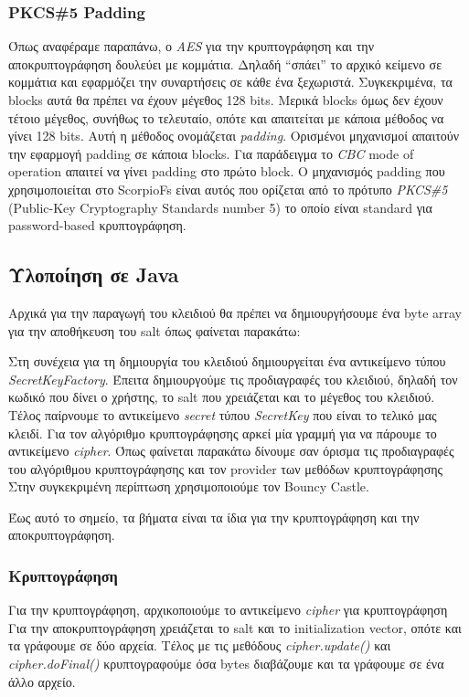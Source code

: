 \documentclass[a4paper]{article}
\begin{document}
\subsubsection{PKCS\#5 Padding}
Όπως αναφέραμε παραπάνω, ο \emph{AES} για την κρυπτογράφηση και την αποκρυπτογράφηση 
δουλεύει με κομμάτια. Δηλαδή ``σπάει'' το αρχικό κείμενο σε κομμάτια και
εφαρμόζει την συναρτήσεις σε κάθε ένα ξεχωριστά. Συγκεκριμένα, τα blocks αυτά θα
πρέπει να έχουν μέγεθος 128 bits. Μερικά blocks όμως δεν έχουν τέτοιο μέγεθος,
συνήθως το τελευταίο, οπότε και απαιτείται με κάποια μέθοδος να γίνει 128 bits.
Αυτή η μέθοδος ονομάζεται \emph{padding}. Ορισμένοι μηχανισμοί απαιτούν την
εφαρμογή padding σε κάποια blocks. Για παράδειγμα το \emph{CBC} mode of
operation απαιτεί να γίνει padding στο πρώτο block. Ο μηχανισμός padding που
χρησιμοποιείται στο ScorpioFs είναι αυτός που ορίζεται από το πρότυπο
\emph{PKCS\#5} (Public-Key Cryptography Standards number 5) το οποίο είναι
standard για password-based κρυπτογράφηση.

\subsection{Υλοποίηση σε Java}
Αρχικά για την παραγωγή του κλειδιού θα πρέπει να δημιουργήσουμε ένα byte array
για την αποθήκευση του salt όπως φαίνεται παρακάτω:
\lstset{language=Java, numbers=left}


Στη συνέχεια για τη δημιουργία του κλειδιού δημιουργείται ένα αντικείμενο τύπου
\emph{SecretKeyFactory}. Έπειτα δημιουργούμε τις προδιαγραφές του κλειδιού, δηλαδή τον
κωδικό που δίνει ο χρήστης, το salt που χρειάζεται και το μέγεθος του κλειδιού.
Τέλος παίρνουμε το αντικείμενο \emph{secret} τύπου \emph{SecretKey} που είναι το
τελικό μας κλειδί. Για τον αλγόριθμο κρυπτογράφησης αρκεί μία γραμμή για να
πάρουμε το αντικείμενο \emph{cipher}. Όπως φαίνεται παρακάτω δίνουμε σαν όρισμα
τις προδιαγραφές του αλγόριθμου κρυπτογράφησης και τον provider των μεθόδων
κρυπτογράφησης Στην συγκεκριμένη περίπτωση χρησιμοποιούμε τον Bouncy Castle. 
\lstset{language=Java, numbers=left}


Έως αυτό το σημείο, τα βήματα είναι τα ίδια για την κρυπτογράφηση και την
αποκρυπτογράφηση.

\subsubsection{Κρυπτογράφηση}
Για την κρυπτογράφηση, αρχικοποιούμε το αντικείμενο \emph{cipher} για
κρυπτογράφηση Για την αποκρυπτογράφηση χρειάζεται το salt και το initialization
vector, οπότε και τα γράφουμε σε δύο αρχεία. Τέλος με τις μεθόδους
\emph{cipher.update()} και \emph{cipher.doFinal()} κρυπτογραφούμε όσα bytes
διαβάζουμε και τα γράφουμε σε ένα άλλο αρχείο.
\lstset{language=Java, numbers=left}

\end{document}
